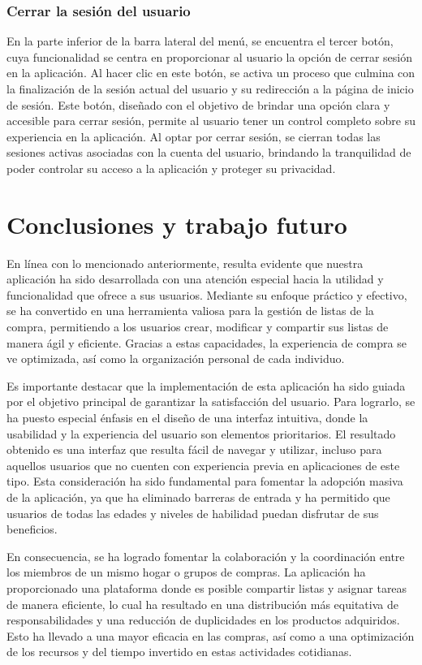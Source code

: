 \documentclass{article}
\begin{document}
\subsubsection{Cerrar la sesión del usuario}

En la parte inferior de la barra lateral del menú, se encuentra el tercer botón, cuya funcionalidad se centra en proporcionar al usuario la opción de cerrar sesión en la aplicación. Al hacer clic en este botón, se activa un proceso que culmina con la finalización de la sesión actual del usuario y su redirección a la página de inicio de sesión. Este botón, diseñado con el objetivo de brindar una opción clara y accesible para cerrar sesión, permite al usuario tener un control completo sobre su experiencia en la aplicación. Al optar por cerrar sesión, se cierran todas las sesiones activas asociadas con la cuenta del usuario, brindando la tranquilidad de poder controlar su acceso a la aplicación y proteger su privacidad.

\section{Conclusiones y trabajo futuro}

En línea con lo mencionado anteriormente, resulta evidente que nuestra aplicación ha sido desarrollada con una atención especial hacia la utilidad y funcionalidad que ofrece a sus usuarios. Mediante su enfoque práctico y efectivo, se ha convertido en una herramienta valiosa para la gestión de listas de la compra, permitiendo a los usuarios crear, modificar y compartir sus listas de manera ágil y eficiente. Gracias a estas capacidades, la experiencia de compra se ve optimizada, así como la organización personal de cada individuo.

Es importante destacar que la implementación de esta aplicación ha sido guiada por el objetivo principal de garantizar la satisfacción del usuario. Para lograrlo, se ha puesto especial énfasis en el diseño de una interfaz intuitiva, donde la usabilidad y la experiencia del usuario son elementos prioritarios. El resultado obtenido es una interfaz que resulta fácil de navegar y utilizar, incluso para aquellos usuarios que no cuenten con experiencia previa en aplicaciones de este tipo. Esta consideración ha sido fundamental para fomentar la adopción masiva de la aplicación, ya que ha eliminado barreras de entrada y ha permitido que usuarios de todas las edades y niveles de habilidad puedan disfrutar de sus beneficios.

En consecuencia, se ha logrado fomentar la colaboración y la coordinación entre los miembros de un mismo hogar o grupos de compras. La aplicación ha proporcionado una plataforma donde es posible compartir listas y asignar tareas de manera eficiente, lo cual ha resultado en una distribución más equitativa de responsabilidades y una reducción de duplicidades en los productos adquiridos. Esto ha llevado a una mayor eficacia en las compras, así como a una optimización de los recursos y del tiempo invertido en estas actividades cotidianas.
\end{document}
